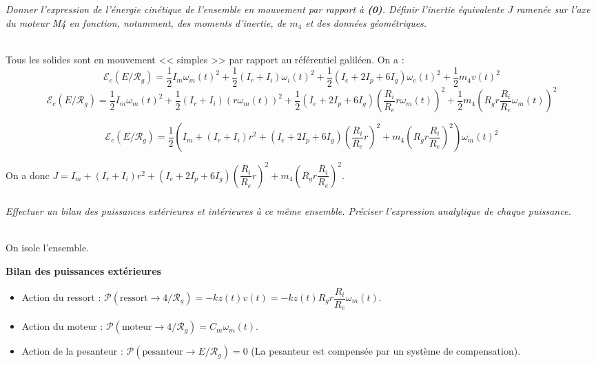 \documentclass[10pt,fleqn]{article} %
\begin{document}
\begin{multicols}{2}
\begin{corrige}
\end{corrige}
\else
\fi

\subparagraph{}\textit{Donner l’expression de l’énergie cinétique de l’ensemble en mouvement par rapport à \textbf{(0)}. Définir l’inertie équivalente $J$ ramenée sur l’axe du moteur M4 en fonction, notamment, des moments d’inertie, de $m_4$ et des données géométriques.}
\ifprof
\begin{corrige} ~\\

Tous les solides sont en mouvement << simples >> par rapport au référentiel galiléen. 
On a : 
$$
\mathcal{E}_c\left(E/\mathcal{R}_g\right) =
\dfrac{1}{2}I_m\omega_m(t)^2
+\dfrac{1}{2}\left(I_r+I_i\right)\omega_i(t)^2
+\dfrac{1}{2}\left(I_e+2I_p+6I_g\right)\omega_e(t)^2
+\dfrac{1}{2}m_4v(t)^2
$$
$$
\mathcal{E}_c\left(E/\mathcal{R}_g\right) =
\dfrac{1}{2}I_m\omega_m(t)^2
+\dfrac{1}{2}\left(I_r+I_i\right)\left( r\omega_m(t)\right)^2
+\dfrac{1}{2}\left(I_e+2I_p+6I_g\right)\left( \dfrac{R_i}{R_e}r\omega_m(t)\right)^2
+\dfrac{1}{2}m_4\left( R_g r \dfrac{R_i}{R_e}\omega_m(t) \right)^2
$$

$$
\mathcal{E}_c\left(E/\mathcal{R}_g\right) =
\dfrac{1}{2}\left(
I_m
+\left(I_r+I_i\right)r^2
+\left(I_e+2I_p+6I_g\right)\left( \dfrac{R_i}{R_e}r\right)^2
+m_4\left( R_g r \dfrac{R_i}{R_e} \right)^2\right)\omega_m(t)^2
$$

On a donc $J=I_m
+\left(I_r+I_i\right)r^2
+\left(I_e+2I_p+6I_g\right)\left( \dfrac{R_i}{R_e}r\right)^2
+m_4\left( R_g r \dfrac{R_i}{R_e} \right)^2$.
\end{corrige}
\else
\fi


\subparagraph{}\textit{Effectuer un bilan des puissances extérieures et intérieures à ce même ensemble. Préciser l’expression analytique de chaque puissance.}
\ifprof
\begin{corrige} ~\\

On isole l'ensemble. 

\textbf{Bilan des puissances extérieures}
\begin{itemize}
\item Action du ressort : $\mathcal{P}\left(\text{ressort}\to 4/\mathcal{R}_g \right)=-kz(t)v(t)=-kz(t)R_g r \dfrac{R_i}{R_e}\omega_m(t)$.
\item Action du moteur : $\mathcal{P}\left(\text{moteur}\to 4/\mathcal{R}_g \right)=C_m\omega_m(t)$.
\item Action de la pesanteur : $\mathcal{P}\left(\text{pesanteur}\to E/\mathcal{R}_g \right)=0$ (La pesanteur est compensée par un système de compensation).
\end{itemize}


\end{corrige}
\end{multicols}
\end{document}
